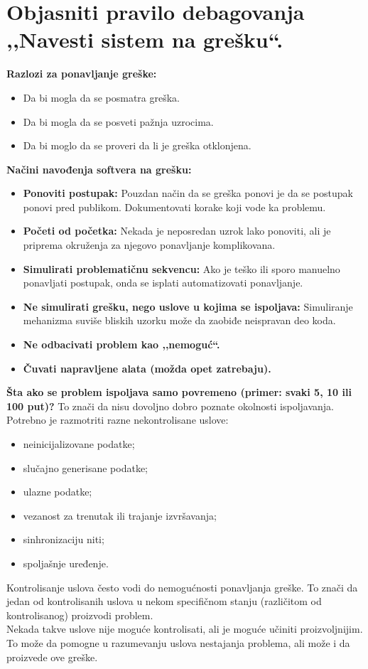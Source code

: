 \documentclass[a4paper]{article}
\begin{document}
\section{Objasniti pravilo debagovanja ,,Navesti sistem na grešku``.}
  \noindent \textbf{Razlozi za ponavljanje greške:}
  \begin{itemize}
    \item Da bi mogla da se posmatra greška.
    \item Da bi mogla da se posveti pažnja uzrocima.
    \item Da bi moglo da se proveri da li je greška otklonjena.
  \end{itemize}
  \textbf{Načini navođenja softvera na grešku:}
  \begin{itemize}
    \item \textbf{Ponoviti postupak:} Pouzdan način da se greška ponovi je da se postupak ponovi pred
          publikom. Dokumentovati korake koji vode ka problemu.
    \item \textbf{Početi od početka:} Nekada je neposredan uzrok lako ponoviti, ali je priprema 
          okruženja za njegovo ponavljanje komplikovana.
    \item \textbf{Simulirati problematičnu sekvencu:} Ako je teško ili sporo manuelno ponavljati postupak, onda
          se isplati automatizovati ponavljanje.
    \item \textbf{Ne simulirati grešku, nego uslove u kojima se ispoljava:} Simuliranje mehanizma 
          suviše bliskih uzorku može da zaobiđe neispravan deo koda.
    \item \textbf{Ne odbacivati problem kao ,,nemoguć``.}
    \item \textbf{Čuvati napravljene alata (možda opet zatrebaju).}
  \end{itemize}
  \textbf{Šta ako se problem ispoljava samo povremeno (primer: svaki 5, 10 ili 100 put)?} To znači
  da nisu dovoljno dobro poznate okolnosti ispoljavanja. Potrebno je razmotriti razne 
  nekontrolisane uslove:
  \begin{itemize}
    \item neinicijalizovane podatke;
    \item slučajno generisane podatke;
    \item ulazne podatke;
    \item vezanost za trenutak ili trajanje izvršavanja;
    \item sinhronizaciju niti;
    \item spoljašnje uređenje.
  \end{itemize} 
  Kontrolisanje uslova često vodi do nemogućnosti ponavljanja greške. To znači da jedan od kontrolisanih
  uslova u nekom specifičnom stanju (različitom od kontrolisanog) proizvodi problem.\\
  \indent Nekada takve uslove nije moguće kontrolisati, ali je moguće učiniti proizvoljnijim. To
  može da pomogne u razumevanju uslova nestajanja problema, ali može i da proizvede ove greške.\\
  
\end{document}
